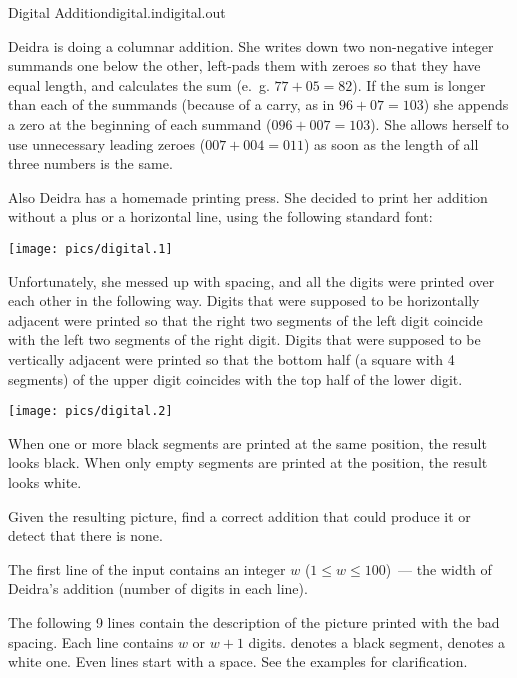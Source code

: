 \begin{problem}{Digital Addition}{digital.in}{digital.out}{\timeLimit}


Deidra is doing a columnar addition.
She writes down two non-negative integer summands one below the other,
left-pads them with zeroes so that they have equal length,
and calculates the sum (e.~g. $77+05=82$). If the sum is longer than each of the summands
(because of a carry, as in $96+07=103$) she appends a zero at the beginning of each summand
($096+007=103$). She allows herself to use unnecessary leading zeroes ($007+004=011$)
as soon as the length of all three numbers is the same.

Also Deidra has a homemade printing press. She decided to print her addition
without a plus or a horizontal line, using the following standard font:

\begin{center}\texttt{[image: pics/digital.1]}\end{center}

Unfortunately, she messed up with spacing, and all the digits were printed over each other
in the following way.
Digits that were supposed to be horizontally adjacent were printed so that
the right two segments of the left digit coincide with the left two segments of the right digit.
Digits that were supposed to be vertically adjacent were printed so that
the bottom half (a square with 4 segments) of the upper digit coincides with the top half of the lower digit.

\begin{center}
\texttt{[image: pics/digital.2]}
\end{center}

When one or more black segments are printed at the same position, the result looks black.
When only empty segments are printed at the position, the result looks white.

Given the resulting picture, find a correct addition that could produce it or detect that there is none.

\InputFile

The first line of the input contains an integer $w$ ($1 \le w \le 100$)~---
the width of Deidra's addition (number of digits in each line).

The following 9 lines contain the description of the picture printed with the bad spacing.
Each line contains $w$ or $w+1$ digits.
 denotes a black segment,  denotes a white one. Even lines start with a space.
See the examples for clarification.


\end{problem}

